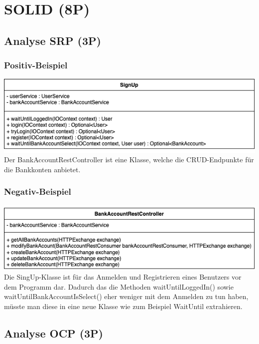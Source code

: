 \section{SOLID (8P)}

\subsection{Analyse SRP (3P)}

\subsubsection*{Positiv-Beispiel}
\includegraphics[width=\linewidth]{kapitel3_solid/SignUp.png}
Der BankAccountRestController ist eine Klasse, welche die CRUD-Endpunkte für die Bankkonten anbietet.

\subsubsection*{Negativ-Beispiel}
\includegraphics[width=\linewidth]{kapitel3_solid/BankAccountRestController.png}
Die SingUp-Klasse ist für das Anmelden und Registrieren eines Benutzers vor dem Programm dar. Dadurch das die Methoden waitUntilLoggedIn() sowie waitUntilBankAccountIsSelect() eher weniger mit dem Anmelden zu tun haben, müsste man diese in eine neue Klasse wie zum Beispiel WaitUntil extrahieren.



\subsection{Analyse OCP (3P)}

